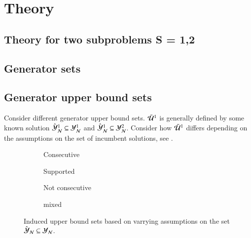 \section{Theory}

\subsection{Theory for two subproblems S = {1,2}}

\subsection{Generator sets}
	
\subsection{Generator upper bound sets}
Consider different generator upper bound sets. $\bar{\mathcal{U}}^{1}$ is generally defined by some known solution $\hat{\mathcal{Y}}_\mathcal{N}^1 \subseteq \mathcal{Y}_{\mathcal{N}}^1$ and  $\hat{\mathcal{Y}}_\mathcal{N}^1 \subseteq \mathcal{Y}_{\mathcal{N}}^2$. Consider how $\bar{\mathcal{U}}^{1}$ differs depending on the assumptions on the set of incumbent solutions, see .



\begin{figure}[ht!]
\centering
	\begin{subfigure}{0.47\textwidth}
		\centering
		\scalebox{1}{}
		\caption{Consecutive}
		\label{fig:ub_types-consecutive}
	\end{subfigure}
	\hfill
	\begin{subfigure}{0.47\textwidth}
		\centering
		\scalebox{1}{}
		\caption{Supported}
		\label{fig:ub_types-supported}
	\end{subfigure}
	\hfill
	\begin{subfigure}{0.47\textwidth}
		\centering
		\scalebox{1}{}
		\caption{Not consecutive}
		\label{fig:ub_types-nonconsecutive}
	\end{subfigure}
	\hfill
	\begin{subfigure}{0.47\textwidth}
		\centering
		\scalebox{1}{}
		\caption{mixed}
		\label{fig:ub_types-mixed}
	\end{subfigure}

	\label{fig:ub-types}
	\caption{Induced upper bound sets based on varrying assumptions on the set $\hat{\mathcal{Y}}_\mathcal{N} \subseteq \mathcal{Y}_{\mathcal{N}}$.}
\end{figure}

